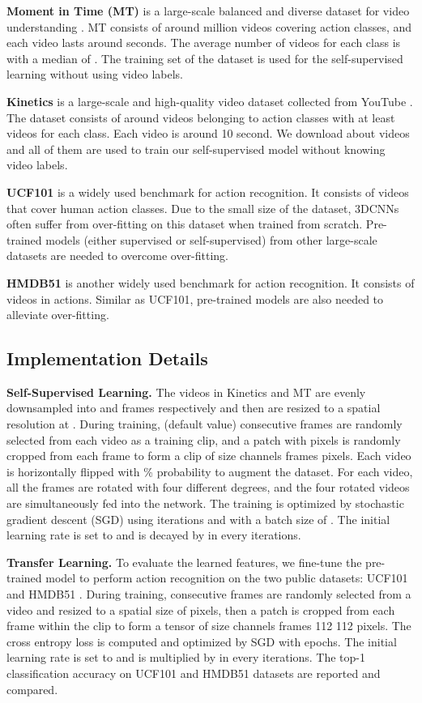 \documentclass[10pt,twocolumn,letterpaper]{article}
\begin{document}
\textbf{Moment in Time (MT)} is a large-scale balanced and diverse dataset for video understanding \cite{MITS}. MT consists of around  million videos covering  action classes, and each video lasts around  seconds. The average number of videos for each class is  with a median of . The training set of the dataset is used for the self-supervised learning without using video labels.

\textbf{Kinetics} is a large-scale and high-quality video dataset collected from YouTube \cite{Kinetics}. The dataset consists of around  videos belonging to  action classes with at least  videos for each class. Each video is around 10 second. We download about  videos and all of them are used to train our self-supervised model without knowing video labels.



\textbf{UCF101} is a widely used benchmark for action recognition. It consists of  videos that cover  human action classes. Due to the small size of the dataset, 3DCNNs often suffer from over-fitting on this dataset when trained from scratch. Pre-trained models (either supervised or self-supervised) from other large-scale datasets are needed to overcome over-fitting. 

\textbf{HMDB51} is another widely used benchmark for action recognition. It consists of  videos in  actions. Similar as UCF101, pre-trained models are also needed to alleviate over-fitting.

\subsection{Implementation Details}

\textbf{Self-Supervised Learning.} The videos in Kinetics and MT are evenly downsampled into  and  frames respectively and then are resized to a spatial resolution at . During training,  (default value) consecutive frames are randomly selected from each video as a training clip, and a patch with  pixels is randomly cropped from each frame to form a clip of size  channels   frames  pixels. Each video is horizontally flipped with \% probability to augment the dataset. For each video, all the frames are rotated with four different degrees, and the four rotated videos are simultaneously fed into the network. The training is optimized by stochastic gradient descent (SGD) using  iterations and with a batch size of . The initial learning rate is set to  and is decayed by  in every  iterations. 

\textbf{Transfer Learning.} To evaluate the learned features, we fine-tune the pre-trained model to perform action recognition on the two public datasets:  UCF101 \cite{UCF101} and HMDB51 \cite{HMDB51}. During training,  consecutive frames are randomly selected from a video and resized to a spatial size of  pixels, then a  patch is cropped from each frame within the clip to form a tensor of size  channels   frames  112  112 pixels. The cross entropy loss is computed and optimized by SGD with  epochs. The initial learning rate is set to  and is multiplied by  in every  iterations. The top-1 classification accuracy on UCF101 and HMDB51 datasets are reported and compared.
\end{document}
